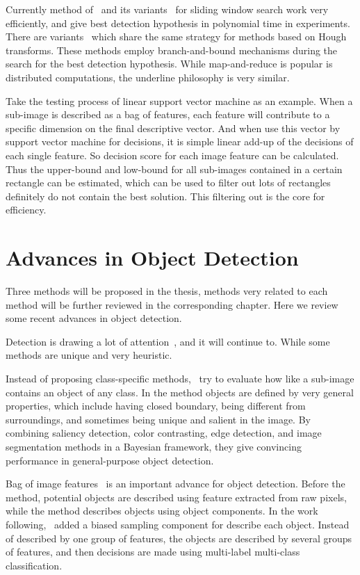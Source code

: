 Currently method of~\citep{ij15} and its variants~\citep{ac1} for sliding window search work very efficiently, and give best detection hypothesis in polynomial time in experiments. There are variants~\citep{ac27} which share the same strategy for methods based on Hough transforms. These methods employ branch-and-bound mechanisms during the search for the best detection hypothesis. While map-and-reduce is popular is distributed computations, the underline philosophy is very similar.

Take the testing process of linear support vector machine as an example. When a sub-image is described as a bag of features, each feature will contribute to a specific dimension on the final descriptive vector.
And when use this vector by support vector machine for decisions, it is simple linear add-up of the decisions of each single feature. So decision score for each image feature can be calculated. Thus the upper-bound and low-bound for all sub-images contained in a certain rectangle can be estimated, which can be used to filter out lots of rectangles definitely do not contain the best solution. This filtering out is the core for efficiency.

\section{Advances in Object Detection}

Three methods will be proposed in the thesis, methods very related to each method will be further reviewed in the corresponding chapter. Here we review some recent advances in object detection.

Detection is drawing a lot of attention~\citep{ij4,ac31,ac30,ac4,ac32,ac29,ac28,ac1,ac9,ac2,ac3,ac22,lb1,ac5,ac10,ac21,ac18}, and it will continue to. While some methods are unique and very heuristic.

Instead of proposing class-specific methods,~\citep{wiao} try to evaluate how like a sub-image contains an object of any class. In the method objects are defined by very general properties, which include having closed boundary, being different from surroundings, and sometimes being unique and salient in the image. By combining saliency detection, color contrasting, edge detection, and image segmentation methods in a Bayesian framework, they give convincing performance in general-purpose object detection.

Bag of image features~\citep{bgf} is an important advance for object detection. Before the method, potential objects are described using feature extracted from raw pixels, while the method describes objects using object components. In the work following,~\citep{ij13} added a biased sampling component for describe each object. Instead of described by one group of features, the objects are described by several groups of features, and then decisions are made using multi-label multi-class classification.

